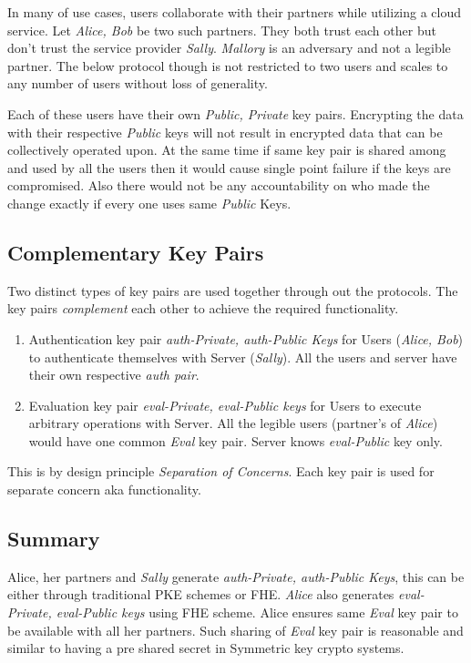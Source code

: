 \documentclass[conference]{IEEEtran}
\numberwithin{equation}{section}
\begin{document}
In many of use cases, users collaborate with their partners while utilizing a cloud service. Let \emph{Alice, Bob} be two such partners. They both trust each other but don't trust the service provider \emph{Sally}. \emph{Mallory} is an adversary and not a legible partner. The below protocol though is not restricted to two users and scales to any number of users without loss of generality.

Each of these users have their own \emph{Public, Private} key pairs. Encrypting the data with their respective \emph{Public} keys will not result in encrypted data that can be collectively operated upon. At the same time if same key pair is shared among and used by all the users then it would cause single point failure if the keys are compromised. Also there would not be any accountability on who made the change exactly if every one uses same \emph{Public} Keys.
\subsection{Complementary Key Pairs}
 Two distinct types of key pairs are used together through out the protocols. The key pairs \emph{complement} each other to achieve the required functionality.
\begin{enumerate}
\item  Authentication key pair \emph{auth-Private, auth-Public Keys} for Users (\emph{Alice, Bob}) to authenticate
themselves with Server (\emph{Sally}). All the users and server have their own respective \emph{auth pair}.
\item Evaluation key pair \emph{eval-Private, eval-Public keys} for Users to execute arbitrary operations
with Server. All the legible users (partner's of \emph{Alice}) would have one common \emph{Eval} key pair. Server knows \emph{eval-Public} key only.
\end{enumerate}
This is by design principle \emph{Separation of Concerns}. Each key pair is used for separate concern aka functionality.
\subsection{Summary}
Alice, her partners and \emph{Sally}  generate \emph{auth-Private, auth-Public Keys}, this can be either through traditional PKE schemes or FHE. \emph{Alice} also generates \emph{eval-Private, eval-Public keys} using FHE scheme. Alice ensures same \emph{Eval} key pair to be available with all her partners. Such sharing of \emph{Eval} key pair is reasonable and similar to having a pre shared secret in Symmetric key crypto systems.
\end{document}
